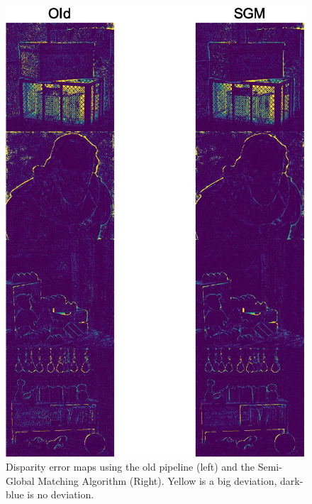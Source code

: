 \documentclass  [
  paper    = a4,
  BCOR     = 10mm,
  twoside,
  fontsize = 12pt,
  fleqn,
  toc      = bibnumbered,
  toc      = listofnumbered,
  numbers  = noendperiod,
  headings = normal,
  listof   = leveldown,
  version  = 3.03
]                                       {scrreprt}
\begin{document}
\begin{figure}
	\centering
	\includegraphics[width=1\linewidth]{images/sgm_results_thresh}
	\caption[Semi-Global Matching Results]{Disparity error maps using the old pipeline (left) and the Semi-Global Matching Algorithm (Right). Yellow is a big deviation, dark-blue is no deviation.}
	\label{fig:sgmresultsthresh}
\end{figure}
\end{document}
